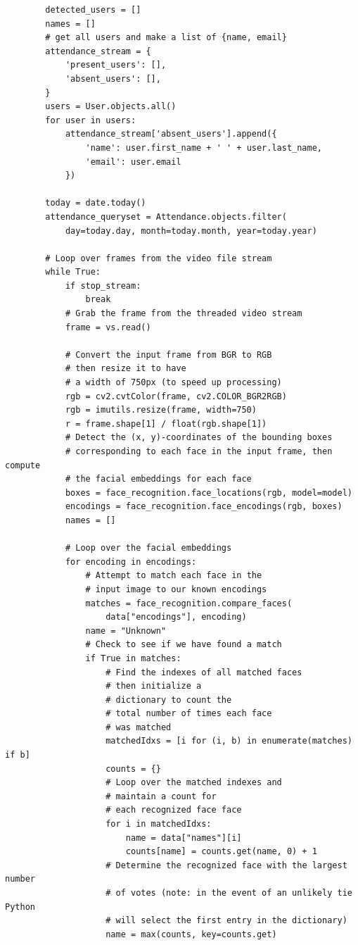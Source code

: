 \begin{itemize}
\begin{verbatim}
        detected_users = []
        names = []
        # get all users and make a list of {name, email}
        attendance_stream = {
            'present_users': [],
            'absent_users': [],
        }
        users = User.objects.all()
        for user in users:
            attendance_stream['absent_users'].append({
                'name': user.first_name + ' ' + user.last_name,
                'email': user.email
            })

        today = date.today()
        attendance_queryset = Attendance.objects.filter(
            day=today.day, month=today.month, year=today.year)

        # Loop over frames from the video file stream
        while True:
            if stop_stream:
                break
            # Grab the frame from the threaded video stream
            frame = vs.read()

            # Convert the input frame from BGR to RGB 
            # then resize it to have
            # a width of 750px (to speed up processing)
            rgb = cv2.cvtColor(frame, cv2.COLOR_BGR2RGB)
            rgb = imutils.resize(frame, width=750)
            r = frame.shape[1] / float(rgb.shape[1])
            # Detect the (x, y)-coordinates of the bounding boxes
            # corresponding to each face in the input frame, then compute
            # the facial embeddings for each face
            boxes = face_recognition.face_locations(rgb, model=model)
            encodings = face_recognition.face_encodings(rgb, boxes)
            names = []

            # Loop over the facial embeddings
            for encoding in encodings:
                # Attempt to match each face in the 
                # input image to our known encodings
                matches = face_recognition.compare_faces(
                    data["encodings"], encoding)
                name = "Unknown"
                # Check to see if we have found a match
                if True in matches:
                    # Find the indexes of all matched faces 
                    # then initialize a
                    # dictionary to count the
                    # total number of times each face
                    # was matched
                    matchedIdxs = [i for (i, b) in enumerate(matches) if b]
                    counts = {}
                    # Loop over the matched indexes and 
                    # maintain a count for
                    # each recognized face face
                    for i in matchedIdxs:
                        name = data["names"][i]
                        counts[name] = counts.get(name, 0) + 1
                    # Determine the recognized face with the largest number
                    # of votes (note: in the event of an unlikely tie Python
                    # will select the first entry in the dictionary)
                    name = max(counts, key=counts.get)


\end{verbatim}
\end{itemize}
